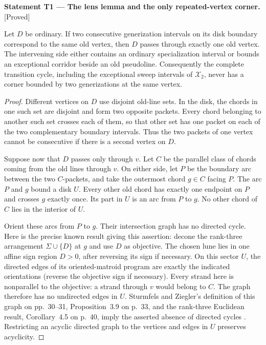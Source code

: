 \documentclass[11pt,a4paper]{article}
\newenvironment{resultenv}[3]{\par\medskip\phantomsection\label{#1}\noindent\textbf{Statement #1 --- #3.}\quad\textsf{[#2]}\par\smallskip\noindent\ignorespaces}{\par\medskip}
\begin{document}
\begin{resultenv}{T1}{Proved}{The lens lemma and the only repeated-vertex corner}
Let $D$ be ordinary. If two consecutive generization intervals on its
disk boundary correspond to the same old vertex, then $D$ passes through
exactly one old vertex. The intervening side either contains an ordinary
specialization interval or bounds an exceptional corridor beside an old
pseudoline. Consequently the complete transition cycle, including the
exceptional sweep intervals of $\mathcal X_2$, never has a corner bounded
by two generizations at the same vertex.
\end{resultenv}
\begin{proof}
Different vertices on $D$ use disjoint old-line sets. In the disk, the
chords in one such set are disjoint and form two opposite packets. Every
chord belonging to another such set crosses each of them, so that other
set has one packet on each of the two complementary boundary intervals.
Thus the two packets of one vertex cannot be consecutive if there is a
second vertex on $D$.

Suppose now that $D$ passes only through $v$. Let $C$ be the parallel
class of chords coming from the old lines through $v$. On either side,
let $P$ be the boundary arc between the two $C$-packets, and take the
outermost chord $g\in C$ facing $P$. The arc $P$ and $g$ bound a disk
$U$. Every other old chord has exactly one endpoint on $P$ and crosses
$g$ exactly once. Its part in $U$ is an arc from $P$ to $g$. No other
chord of $C$ lies in the interior of $U$.

Orient these arcs from $P$ to $g$. Their intersection graph has no
directed cycle. Here is the precise known result giving this assertion:
decone the rank-three arrangement $\Sigma\cup\{D\}$ at $g$ and use
$D$ as objective. The chosen lune lies in one affine sign region
$D>0$, after reversing its sign if necessary. On this sector $U$, the directed edges
of its oriented-matroid program are exactly the indicated orientations
(reverse the objective sign if necessary). Every strand here is
nonparallel to the objective: a strand through $v$ would belong to $C$.
The graph therefore has no undirected edges in $U$.
Sturmfels and Ziegler's definition of this graph on pp.~30--31,
Proposition~3.9 on p.~33, and the rank-three Euclidean result,
Corollary~4.5 on p.~40, imply the asserted absence of directed cycles
\cite{SZ1993}. Restricting an acyclic directed graph to
the vertices and edges in $U$ preserves acyclicity.


\end{proof}
\end{document}
